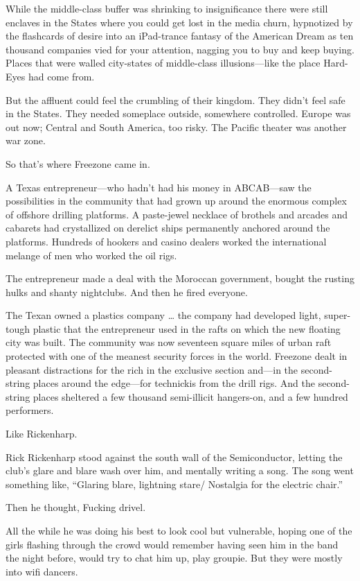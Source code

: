 While the middle-class buffer was shrinking to insignificance there were still enclaves in the States where you could get lost in the media churn, hypnotized by the flashcards of desire into an iPad-trance fantasy of the American Dream as ten thousand companies vied for your attention, nagging you to buy and keep buying. Places that were walled city-states of middle-class illusions—like the place Hard-Eyes had come from.

But the affluent could feel the crumbling of their kingdom. They didn’t feel safe in the States. They needed someplace outside, somewhere controlled. Europe was out now; Central and South America, too risky. The Pacific theater was another war zone.

So that’s where Freezone came in.

A Texas entrepreneur—who hadn’t had his money in ABCAB—saw the possibilities in the community that had grown up around the enormous complex of offshore drilling platforms. A paste-jewel necklace of brothels and arcades and cabarets had crystallized on derelict ships permanently anchored around the platforms. Hundreds of hookers and casino dealers worked the international melange of men who worked the oil rigs.

The entrepreneur made a deal with the Moroccan government, bought the rusting hulks and shanty nightclubs. And then he fired everyone.

The Texan owned a plastics company … the company had developed light, super-tough plastic that the entrepreneur used in the rafts on which the new floating city was built. The community was now seventeen square miles of urban raft protected with one of the meanest security forces in the world. Freezone dealt in pleasant distractions for the rich in the exclusive section and—in the second-string places around the edge—for technickis from the drill rigs. And the second-string places sheltered a few thousand semi-illicit hangers-on, and a few hundred performers.

Like Rickenharp.

Rick Rickenharp stood against the south wall of the Semiconductor, letting the club’s glare and blare wash over him, and mentally writing a song. The song went something like, “Glaring blare, lightning stare/ Nostalgia for the electric chair.”

Then he thought, Fucking drivel.

All the while he was doing his best to look cool but vulnerable, hoping one of the girls flashing through the crowd would remember having seen him in the band the night before, would try to chat him up, play groupie. But they were mostly into wifi dancers.

